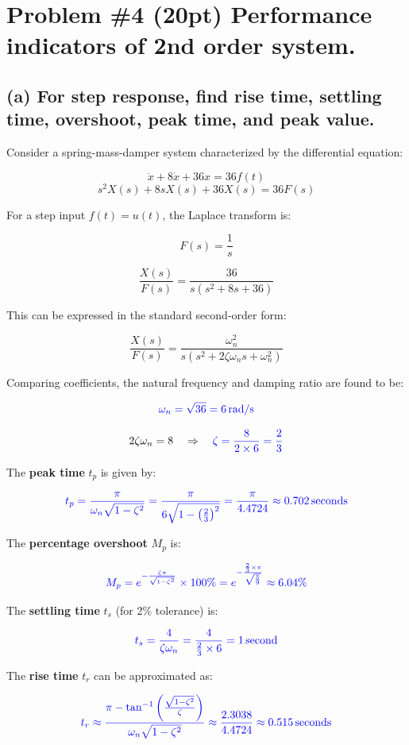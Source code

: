 \documentclass{article}
\begin{document}
\newpage
\newpage
\section*{Problem \#4 (20pt) Performance indicators of 2nd order system.}
\subsection*{(a) For step response, find rise time, settling time, overshoot, peak time, and peak value.}
Consider a spring-mass-damper system characterized by the differential equation:

\[
	\ddot{x} + 8\dot{x} + 36x = 36f(t)
\]
\[
	s^2 X(s) + 8s X(s) + 36X(s) = 36F(s)
\]

For a step input \( f(t) = u(t) \), the Laplace transform is:

\[
	F(s) = \frac{1}{s}
\]

\[
	\frac{X(s)}{F(s)} = \frac{36}{s(s^2 + 8s + 36)}
\]

This can be expressed in the standard second-order form:

\[
	\frac{X(s)}{F(s)} = \frac{\omega_n^2}{s(s^2 + 2\zeta\omega_n s + \omega_n^2)}
\]

Comparing coefficients, the natural frequency and damping ratio are found to be:

\[
	\textcolor{blue}{\omega_n = \sqrt{36} = 6 \, \text{rad/s}}
\]

\[
	2\zeta\omega_n = 8 \quad \Rightarrow \quad \textcolor{blue}{\zeta = \frac{8}{2 \times 6} = \frac{2}{3}}
\]

The \textbf{peak time} \( t_p \) is given by:

\[
	\textcolor{blue}{t_p = \frac{\pi}{\omega_n \sqrt{1 - \zeta^2}} = \frac{\pi}{6 \sqrt{1 - \left(\frac{2}{3}\right)^2}} = \frac{\pi}{4.4724} \approx 0.702 \, \text{seconds}}
\]

The \textbf{percentage overshoot} \( M_p \) is:

\[
	\textcolor{blue}{M_p = e^{-\frac{\zeta \pi}{\sqrt{1 - \zeta^2}}} \times 100\% = e^{-\frac{\frac{2}{3} \times \pi}{\sqrt{\frac{5}{9}}}} \approx 6.04\%}
\]

The \textbf{settling time} \( t_s \) (for 2\% tolerance) is:

\[
	\textcolor{blue}{t_s = \frac{4}{\zeta \omega_n} = \frac{4}{\frac{2}{3} \times 6} = 1 \, \text{second}}
\]

The \textbf{rise time} \( t_r \) can be approximated as:

\[
	\textcolor{blue}{t_r \approx \frac{\pi - \tan^{-1} \left( \frac{\sqrt{1 - \zeta^2}}{\zeta} \right)}{\omega_n \sqrt{1 - \zeta^2}} \approx \frac{2.3038}{4.4724} \approx 0.515 \, \text{seconds}}
\]
\end{document}
